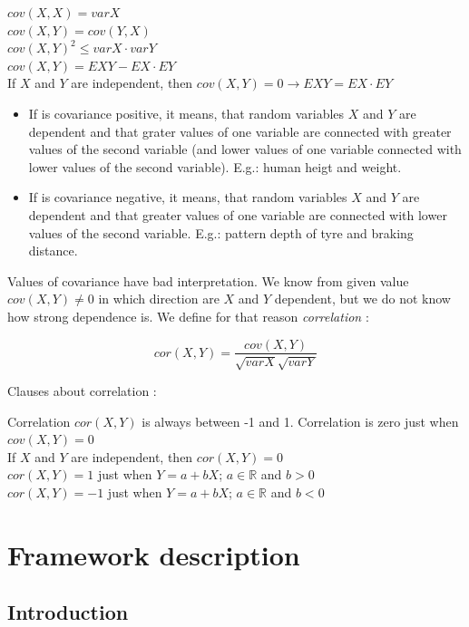 \documentclass[11pt,twoside,a4paper]{book}
\begin{document}
\begin{center}
$cov(X,X)=var X$\\
$cov(X,Y)=cov(Y,X)$\\
$cov(X,Y)^2\leq var X \cdot var Y$\\
$cov(X,Y) = EXY - EX\cdot EY$\\
If $X$ and $Y$ are independent, then
$cov\left(X,Y\right)=0 \rightarrow EXY=EX\cdot EY$\\
\end{center}
\begin{itemize}
  \item If is covariance positive, it means, that random variables $X$ and
$Y$ are dependent and that grater values of one variable are connected with
greater values of the second variable (and lower values of one variable connected with
lower values of the second variable). E.g.: human heigt and weight.
  \item If is covariance negative, it means, that random variables $X$ and
$Y$ are dependent and that greater values of one variable are connected with
lower values of the second variable. E.g.: pattern depth
of tyre and braking distance.
\end{itemize}
Values of covariance have bad interpretation. We know from given value
$cov(X,Y)\neq0$ in which direction are $X$ and $Y$ dependent, but we do not know
how strong dependence is. We define for that reason \textit{correlation}
\cite{kulich:stat}:

$$cor(X,Y)=\frac{cov(X,Y)}{\sqrt{var X}\sqrt{var Y}}$$ 

Clauses about correlation \cite{kulich:stat}:

\begin{center}
Correlation $cor(X,Y)$ is always between -1 and 1. Correlation is zero just when
$cov(X,Y)=0$\\
If $X$ and $Y$ are independent, then $cor(X,Y)=0$\\
$cor(X,Y)=1$ just when $Y=a+bX$; $a\in\mathbb{R}$ and $b>0$\\
$cor(X,Y)=-1$ just when $Y=a+bX$; $a\in\mathbb{R}$ and $b<0$\\
\end{center}


\chapter{Framework description}
\label{chap:framework}
\section{Introduction}
\end{document}
